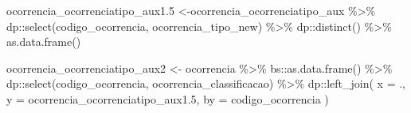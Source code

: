 \documentclass[
]{article}
\newenvironment{Shaded}{\begin{snugshade}}{\end{snugshade}}
\newcommand{\AttributeTok}[1]{\textcolor[rgb]{0.77,0.63,0.00}{#1}}
\newcommand{\FloatTok}[1]{\textcolor[rgb]{0.00,0.00,0.81}{#1}}
\newcommand{\FunctionTok}[1]{\textcolor[rgb]{0.00,0.00,0.00}{#1}}
\newcommand{\NormalTok}[1]{#1}
\newcommand{\OtherTok}[1]{\textcolor[rgb]{0.56,0.35,0.01}{#1}}
\newcommand{\SpecialCharTok}[1]{\textcolor[rgb]{0.00,0.00,0.00}{#1}}
\newcommand{\StringTok}[1]{\textcolor[rgb]{0.31,0.60,0.02}{#1}}
\begin{document}
\begin{Shaded}
\begin{Highlighting}[]
\NormalTok{ocorrencia\_ocorrenciatipo\_aux1}\FloatTok{.5} \OtherTok{\textless{}{-}}\NormalTok{ocorrencia\_ocorrenciatipo\_aux }\SpecialCharTok{\%\textgreater{}\%}\NormalTok{ dp}\SpecialCharTok{::}\FunctionTok{select}\NormalTok{(codigo\_ocorrencia,}
\NormalTok{                                                        ocorrencia\_tipo\_new) }\SpecialCharTok{\%\textgreater{}\%} 
\NormalTok{            dp}\SpecialCharTok{::}\FunctionTok{distinct}\NormalTok{() }\SpecialCharTok{\%\textgreater{}\%} \FunctionTok{as.data.frame}\NormalTok{()}

\NormalTok{ocorrencia\_ocorrenciatipo\_aux2 }\OtherTok{\textless{}{-}}\NormalTok{ ocorrencia }\SpecialCharTok{\%\textgreater{}\%}
\NormalTok{    bs}\SpecialCharTok{::}\FunctionTok{as.data.frame}\NormalTok{() }\SpecialCharTok{\%\textgreater{}\%} 
\NormalTok{    dp}\SpecialCharTok{::}\FunctionTok{select}\NormalTok{(codigo\_ocorrencia, ocorrencia\_classificacao) }\SpecialCharTok{\%\textgreater{}\%}
\NormalTok{    dp}\SpecialCharTok{::}\FunctionTok{left\_join}\NormalTok{(}
        \AttributeTok{x =}\NormalTok{ .,}
        \AttributeTok{y =}\NormalTok{ ocorrencia\_ocorrenciatipo\_aux1}\FloatTok{.5}\NormalTok{,}
        \AttributeTok{by =} \StringTok{\textquotesingle{}codigo\_ocorrencia\textquotesingle{}}
\NormalTok{    )}
\end{Highlighting}
\end{Shaded}
\end{document}
